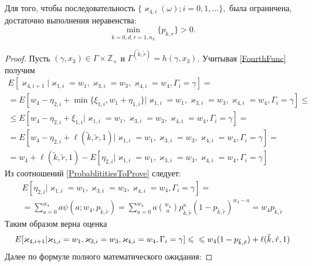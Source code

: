 \documentclass[a4paper,12pt,russian]{extarticle}
\begin{document}
\begin{theorem}
Для того, чтобы последовательность $\{\varkappa_{4,i}(\omega); i =0, 1, \ldots\},$ была ограничена, достаточно выполнения неравенства:
\begin{equation*}
    \min_{k=\overline{0,d}, r=\overline{1,n_k}} {\{p_{k,r}\}} > 0.
\end{equation*}
\end{theorem}
\begin{proof}
Пусть $(\gamma, x_3) \in \Gamma \times {\mathbb Z}_+$ и  $\Gamma^{(\tilde{k},\tilde{r})}=h(\gamma,x_3)$. Учитывая \eqref{FourthFunc} получим
\begin{multline*}
    E[\varkappa_{4,i+1} | \varkappa_{1,i}=w_1,\varkappa_{3,i}=w_3, \varkappa_{4,i}=w_4, \Gamma_i=\gamma] = \\
    =
    E[w_4 - \eta_{2,i} +  \min{\{\xi_{1,i}, w_1 + \eta_{1,i} \}} | \varkappa_{1,i}=w_1,\varkappa_{3,i}=w_3, \varkappa_{4,i}=w_4, \Gamma_i=\gamma] \leqslant \\
    \leqslant
     E[w_4 - \eta_{2,i} +  \xi_{1,i} | \varkappa_{1,i}=w_1,\varkappa_{3,i}=w_3, \varkappa_{4,i}=w_4, \Gamma_i=\gamma] =\\ 
     = 
     E[w_4 - \eta_{2,i} +  \ell(\tilde{k},\tilde{r},1) | \varkappa_{1,i}=w_1,\varkappa_{3,i}=w_3, \varkappa_{4,i}=w_4, \Gamma_i=\gamma] = \\ 
    =
   w_4 + \ell(\tilde{k},\tilde{r},1)  -  E[\eta_{2,i} | \varkappa_{1,i}=w_1,\varkappa_{3,i}=w_3, \varkappa_{4,i}=w_4, \Gamma_i=\gamma] 
\end{multline*}
Из соотношений \eqref{ProbablititiesToProve} следует:
\begin{multline*}
  E[\eta_{2,i} | \varkappa_{1,i}=w_1,\varkappa_{3,i}=w_3, \varkappa_{4,i}=w_4, \Gamma_i=\gamma]
= \\
=
\sum_{a=0}^{w_4}  a \psi(a;w_4, p_{\tilde{k},\tilde{r}}) = 
\sum_{a=0}^{w_4} a {{w_4}\choose{a}} p_{\tilde{k},\tilde{r}}^a (1-p_{\tilde{k},\tilde{r}})^{w_4-a} = w_4 p_{\tilde{k},\tilde{r}} 
\end{multline*}
Таким образом верна оценка 
\begin{equation*}
     E[\varkappa_{4,i+1} | \varkappa_{1,i}=w_1,\varkappa_{3,i}=w_3, \varkappa_{4,i}=w_4, \Gamma_i=\gamma] \leqslant \\ 
     \leqslant
     w_4 (1-p_{\tilde{k},\tilde{r}}) + \ell(\tilde{k},\tilde{r},1)
\end{equation*}
Далее по формуле полного математического ожидания:

\end{proof}
\end{document}
